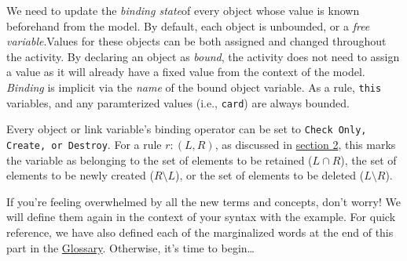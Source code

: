We need to update the \emph{binding state}of every object whose value is known beforehand from the model. By default, each object is
unbounded, or a \emph{free variable}.Values for these objects can be both assigned and changed throughout the activity. By declaring
an object as \emph{bound}, the activity does not need to assign a value as it will already have a fixed value from the context of the model. \emph{Binding} is
implicit via the \emph{name} of the bound object variable. As a rule, \texttt{this} variables, and any paramterized values (i.e.,
\texttt{card}) are always bounded.

Every object or link variable's binding operator can be set to \texttt{Check Only, Create, or Destroy}. For a rule $r: (L, R)$, as discussed in
\hyperlink{explanation}{section 2}, this marks the variable as belonging to the set of elements to be retained ($L\cap R$), the set of elements to be newly
created ($R\setminus L$), or the set of elements to be deleted ($L\setminus R$).

If you're feeling overwhelmed by all the new terms and concepts, don't worry! We will define them again in the context of your syntax with the example. For
quick reference, we have also defined each of the marginalized words at the end of this part in the \hyperlink{glossary}{Glossary}. Otherwise, it's time
to begin\ldots






